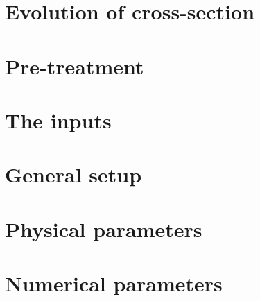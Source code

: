 \documentclass[Courlis]{../../data/TelemacDoc} %
\begin{document}
\chapter{Evolution of cross-section}\label{chap1b}

\newpage
\chapter{Pre-treatment}\label{chap2}

\newpage

\chapter{The inputs}\label{chap3}

\newpage

\chapter{General setup}\label{chap4}

\newpage

\chapter{Physical parameters}\label{chap5}

\newpage
\chapter{Numerical parameters}\label{chap6}

\newpage
\end{document}
